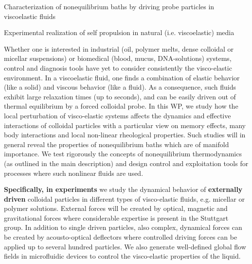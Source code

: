 \begin{workpackage}[id=WPbrown,wphases=0-48,
  short=Brown. particles, %
  title=Brownian particles in nonequilibrium baths, %
  lead=USTUTT,
  USTUTTRM=96,KULRM=6,ULEIRM=6,UNIPDRM=6]

\newrefsection

\begin{wpobjectives}
\begin{compactitem}
\item Characterization of nonequilibrium baths by driving probe particles in viscoelastic fluids
\item Experimental realization of self propulsion in natural (i.e. viscoelastic) media
  \end{compactitem}
\end{wpobjectives}

\begin{wpdescription}

Whether one is interested in industrial (oil, polymer melts, dense colloidal or micellar
suspensions) or biomedical (blood, mucus, DNA-solutions) systems, control and diagnosis
tools have yet to consider consistently the visco-elastic environment.
%
In a viscoelastic fluid, one finds a combination of elastic behavior (like a solid) and
viscous behavior (like a fluid).
%
As a consequence, such fluids exhibit large relaxation times (up to seconds), and can be
easily driven out of thermal equilibrium by a forced colloidal probe.
%
In this WP, we study how the local perturbation of visco-elastic systems affects the
dynamics and effective interactions of colloidal particles with a particular view on memory
effects, many body interactions and local non-linear rheological properties. Such studies
will in general reveal the properties of nonequilibrium baths which are of manifold
importance.
%
We test rigorously the concepts of nonequilibrium thermodynamics (as outlined in the
main description) and design control and exploitation tools for processes where such
nonlinear fluids are used.

{\bf Specifically, in experiments} we study the dynamical behavior of {\bf externally driven} colloidal particles in different types of visco-elastic
fluids, e.g. micellar or polymer solutions. External forces will be created by optical, magnetic and gravitational forces where considerable expertise is present in the Stuttgart group. In addition to single driven particles, also complex, dynamical forces can be created by acousto-optical deflectors where controlled driving forces can be applied up to several hundred particles.
%
We also generate well-defined global flow fields in microfluidic devices \cite{scholz2012}
to control the visco-elastic properties of the liquid.


\end{wpdescription}
\end{workpackage}
